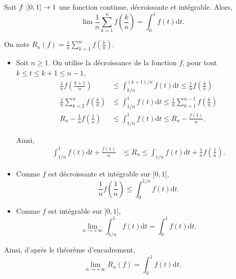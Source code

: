 


\begin{exercice}
    Soit $f : ]0, 1] \to 1$ une fonction continue, décroissante et intégrable. Alors,
    \[
    \lim\limits \frac{1}{n} \sum\limits_{k=1}^n f\left(\frac{k}{n}\right) = \displaystyle\int_0^1 f(t) \mathrm{d}t.
    \]
\end{exercice}

\begin{elem_sol}
On note $R_n(f) = \frac{1}{n} \sum\limits_{k=1}^n f\left(\frac{k}{n}\right)$.
\begin{itemize}
\item Soit $n \geq 1$. On utilise la décroissance de la fonction $f$, pour tout $k \leq t \leq k + 1 \leq n-1$,
\begin{align*}
\frac{1}{n} f\left(\frac{k+1}{n}\right) &\leq \displaystyle\int_{k/n}^{(k+1)/n} f(t) \mathrm{d}t \leq \frac{1}{n} f\left(\frac{k}{n}\right)\\
\frac{1}{n} \sum\limits_{k=2}^{n} f\left(\frac{k}{n}\right) &\leq \displaystyle\int_{1/n}^1 f(t) \mathrm{d}t \leq \frac{1}{n} \sum\limits_{k=1}^{n-1} f\left(\frac{k}{n}\right)\\
R_n - \frac{1}{n} f\left(\frac{1}{n}\right) &\leq \displaystyle\int_{1/n}^1 f(t) \mathrm{d}t \leq R_n - \frac{f(1)}{n}.
\end{align*}

Ainsi,
\begin{align*}
\displaystyle\int_{1/n}^1 f(t) \mathrm{d}t + \frac{f(1)}{n} &\leq R_n \leq \displaystyle\int_{1/n} f(t) \mathrm{d}t + \frac{1}{n}  f\left(\frac{1}{n}\right).
\end{align*}

\item Comme $f$ est décroissante et intégrable sur $]0, 1]$,
\[
\frac{1}{n} f\left(\frac{1}{n}\right) \leq \displaystyle\int_0^{1/n} f(t) \mathrm{d}t.
\]

\item Comme $f$ est intégrable sur $]0, 1]$,
\[
\lim\limits_{n\to+\infty} \displaystyle\int_{1/n}^1 f(t) \mathrm{d}t = \displaystyle\int_0^1 f(t) \mathrm{d}t.
\]
\end{itemize}

Ainsi, d'après le théorème d'encadrement,
\[
\lim\limits_{n\to+\infty} R_n(f) = \displaystyle\int_0^1 f(t) \mathrm{d}t.
\]
\end{elem_sol}

